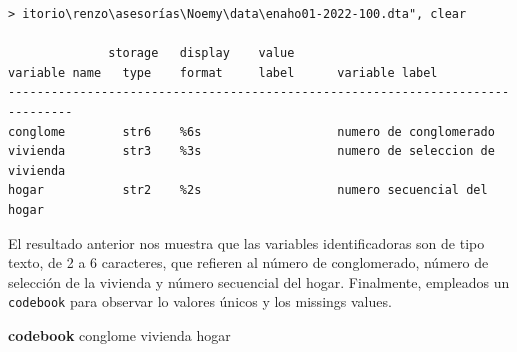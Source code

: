 \documentclass[
]{book}
\newenvironment{Shaded}{\begin{snugshade}}{\end{snugshade}}
\newcommand{\KeywordTok}[1]{\textcolor[rgb]{0.13,0.29,0.53}{\textbf{#1}}}
\newcommand{\NormalTok}[1]{#1}
\theoremstyle{definition}
\theoremstyle{definition}
\theoremstyle{definition}
\theoremstyle{definition}
\theoremstyle{remark}
\begin{document}
\begin{verbatim}
> itorio\renzo\asesorías\Noemy\data\enaho01-2022-100.dta", clear

              storage   display    value
variable name   type    format     label      variable label
-------------------------------------------------------------------------------
conglome        str6    %6s                   numero de conglomerado
vivienda        str3    %3s                   numero de seleccion de vivienda
hogar           str2    %2s                   numero secuencial del hogar
\end{verbatim}

El resultado anterior nos muestra que las variables identificadoras son de tipo texto, de 2 a 6 caracteres, que refieren al número de conglomerado, número de selección de la vivienda y número secuencial del hogar. Finalmente, empleados un \texttt{codebook} para observar lo valores únicos y los missings values.

\begin{Shaded}
\begin{Highlighting}[]
\KeywordTok{codebook}\NormalTok{ conglome vivienda hogar}
\end{Highlighting}
\end{Shaded}
\end{document}
